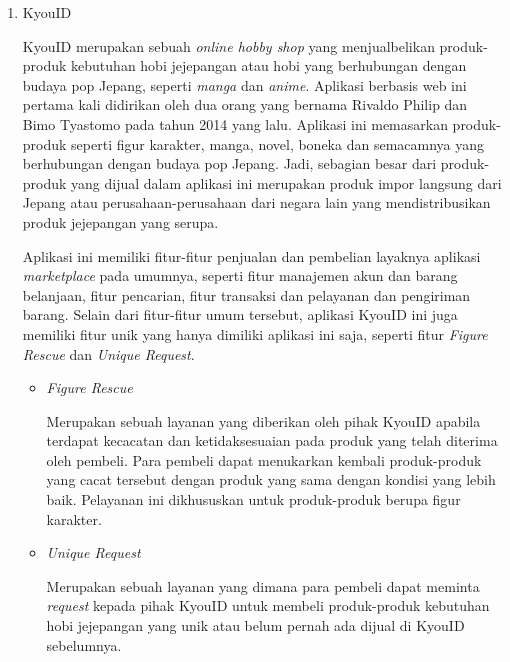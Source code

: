 \documentclass[a4paper]{article}
\begin{document}
\begin{itemize}
\begin{enumerate}
\begin{itemize}
        \end{itemize}

        \item KyouID
        
        KyouID merupakan sebuah \textit{online hobby shop} yang menjualbelikan produk-produk kebutuhan hobi jejepangan atau hobi yang berhubungan dengan budaya pop Jepang, seperti \textit{manga} dan \textit{anime}. Aplikasi berbasis web ini pertama kali didirikan oleh dua orang yang bernama Rivaldo Philip dan Bimo Tyastomo pada tahun 2014 yang lalu\autocite{pendiri-kyouid}. Aplikasi ini memasarkan produk-produk seperti figur karakter, manga, novel, boneka dan semacamnya yang berhubungan dengan budaya pop Jepang\autocite{web-kyouid}. Jadi, sebagian besar dari produk-produk yang dijual dalam aplikasi ini merupakan produk impor langsung dari Jepang atau perusahaan-perusahaan dari negara lain yang mendistribusikan produk jejepangan yang serupa.

        Aplikasi ini memiliki fitur-fitur penjualan dan pembelian layaknya aplikasi \textit{marketplace} pada umumnya, seperti fitur manajemen akun dan barang belanjaan, fitur pencarian, fitur transaksi dan pelayanan dan pengiriman barang. Selain dari fitur-fitur umum tersebut, aplikasi KyouID ini juga memiliki fitur unik yang hanya dimiliki aplikasi ini saja, seperti fitur \textit{Figure Rescue} dan \textit{Unique Request}.

        \begin{itemize}
            \item \textit{Figure Rescue}
            
            Merupakan sebuah layanan yang diberikan oleh pihak KyouID apabila terdapat kecacatan dan ketidaksesuaian pada produk yang telah diterima oleh pembeli. Para pembeli dapat menukarkan kembali produk-produk yang cacat tersebut dengan produk yang sama dengan kondisi yang lebih baik. Pelayanan ini dikhususkan untuk produk-produk berupa figur karakter\autocite{kyouid-rescue}.

            \item \textit{Unique Request}
            
            Merupakan sebuah layanan yang dimana para pembeli dapat meminta \textit{request} kepada pihak KyouID untuk membeli produk-produk kebutuhan hobi jejepangan yang unik atau belum pernah ada dijual di KyouID sebelumnya\autocite{kyouid-req}.

        \end{itemize}


\end{enumerate}
\end{itemize}
\end{document}
